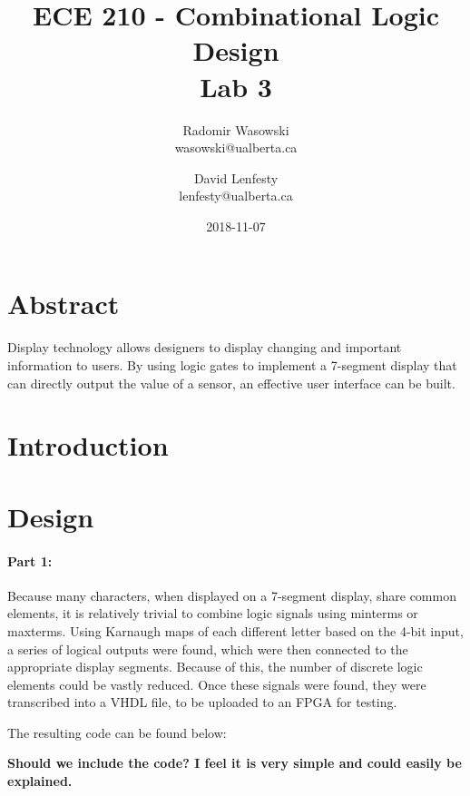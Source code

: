\documentclass{article}
\title{ECE 210 - Combinational Logic Design \\ Lab 3}
\date{2018-11-07}
\author{Radomir Wasowski \\ wasowski@ualberta.ca
        \and David Lenfesty \\ lenfesty@ualberta.ca}
\begin{document}
\doublespacing
\maketitle
\newpage

\singlespacing

\section{Abstract}

Display technology allows designers to display changing and important information to users.
By using logic gates to implement a 7-segment display that can directly output the value of a sensor,
an effective user interface can be built.

\section{Introduction}



\section{Design}

\paragraph{Part 1:}

Because many characters, when displayed on a 7-segment display, share common elements,
it is relatively trivial to combine logic signals using minterms or maxterms.
Using Karnaugh maps of each different letter based on the 4-bit input, a series of logical outputs
were found, which were then connected to the appropriate display segments.
Because of this, the number of discrete logic elements could be vastly reduced.
Once these signals were found, they were transcribed into a VHDL file,
to be uploaded to an FPGA for testing.

The resulting code can be found below:

\textbf{Should we include the code? I feel it is very simple and could easily
be explained.}
\end{document}
